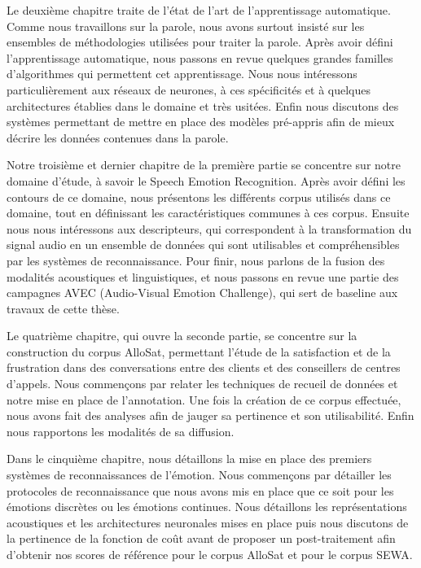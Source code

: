 Le deuxième chapitre traite de l'état de l'art de l'apprentissage automatique. Comme nous travaillons sur la parole, nous avons surtout insisté sur les ensembles de méthodologies utilisées pour traiter la parole. Après avoir défini l'apprentissage automatique, nous passons en revue quelques grandes familles d'algorithmes qui permettent cet apprentissage. Nous nous intéressons particulièrement aux réseaux de neurones, à ces spécificités et à quelques architectures établies dans le domaine et très usitées. Enfin nous discutons des systèmes permettant de mettre en place des modèles pré-appris afin de mieux décrire les données contenues dans la parole.

Notre troisième et dernier chapitre de la première partie se concentre sur notre domaine d'étude, à savoir le Speech Emotion Recognition. Après avoir défini les contours de ce domaine, nous présentons les différents corpus utilisés dans ce domaine, tout en définissant les caractéristiques communes à ces corpus. Ensuite nous nous intéressons aux descripteurs, qui correspondent à la transformation du signal audio en un ensemble de données qui sont utilisables et compréhensibles par les systèmes de reconnaissance. Pour finir, nous parlons de la fusion des modalités acoustiques et linguistiques, et nous passons en revue une partie des campagnes AVEC (Audio-Visual Emotion Challenge), qui sert de baseline aux travaux de cette thèse.

Le quatrième chapitre, qui ouvre la seconde partie, se concentre sur la construction du corpus AlloSat, permettant l'étude de la satisfaction et de la frustration dans des conversations entre des clients et des conseillers de centres d'appels. Nous commençons par relater les techniques de recueil de données et notre mise en place de l'annotation. Une fois la création de ce corpus effectuée, nous avons fait des analyses afin de jauger sa pertinence et son utilisabilité. Enfin nous rapportons les modalités de sa diffusion.

Dans le cinquième chapitre, nous détaillons la mise en place des premiers systèmes de reconnaissances de l'émotion. Nous commençons par détailler les protocoles de reconnaissance que nous avons mis en place que ce soit pour les émotions discrètes ou les émotions continues. Nous détaillons les représentations acoustiques et les architectures neuronales mises en place puis nous discutons de la pertinence de la fonction de coût avant de proposer un post-traitement afin d'obtenir nos scores de référence pour le corpus AlloSat et pour le corpus SEWA.

